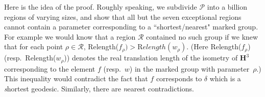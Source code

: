 Here is the idea of the proof.
Roughly speaking, we subdivide ${\mathcal P}$ into a billion regions
of varying sizes,
and show that all but the seven exceptional regions cannot contain 
a parameter corresponding to a  
``shortest/nearest" marked group.
For example we would know that 
a region ${\mathcal R}$ contained no such group if we knew that for each 
point $\rho\in {\mathcal R}$,
Relength($f_\rho) > {\mathrm Relength}(w_\rho).$  
(Here Relength($f_\rho$) (resp.\ Relength($w_\rho^{\phantom{|}}$))
denotes the real translation length of the isometry of ${\mathbf H}^3$ 
corresponding to
the element $f$ (resp.\ $w$) in the marked group with parameter~$\rho.$)
This inequality would contradict the fact that $f$ corresponds to $\delta$ 
which is a {\textit shortest} geodesic.  Similarly, there are {\textit nearest}
contradictions.
